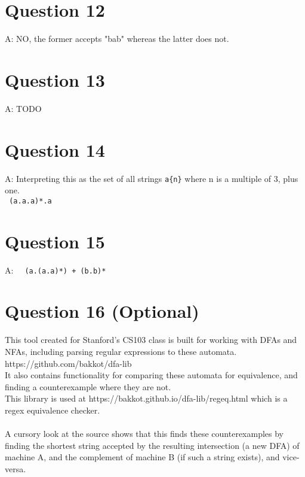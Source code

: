 \documentclass[english]{scrartcl}
\begin{document}
\section*{Question 12}
A: NO, the former accepts "bab" whereas the latter does not.

\section*{Question 13}
A: TODO

\section*{Question 14}
A: Interpreting this as the set of all strings \verb~a{n}~ where n is a multiple of 3, plus one.\\
\verb~ (a.a.a)*.a ~

\section*{Question 15}
A: \verb~  (a.(a.a)*) + (b.b)*  ~

\section*{Question 16 (Optional)}
This tool created for Stanford's CS103 class is built for working with DFAs and NFAs, including parsing regular expressions to these automata. \\
https://github.com/bakkot/dfa-lib \\
It also contains functionality for comparing these automata for equivalence, and finding a counterexample where they are not. \\
This library is used at https://bakkot.github.io/dfa-lib/regeq.html which is a regex equivalence checker. \\
\\
A cursory look at the source shows that this finds these counterexamples by finding the shortest string accepted by the resulting intersection (a new DFA) of machine A, and the complement of machine B (if such a string exists), and vice-versa.
\end{document}
